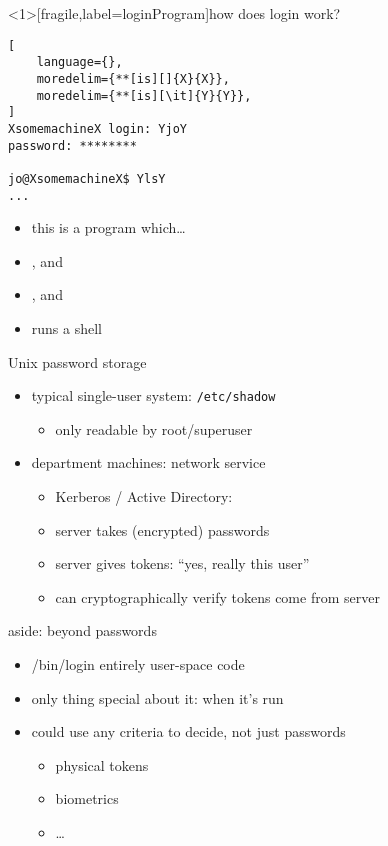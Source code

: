 \begin{frame}<1>[fragile,label=loginProgram]{how does login work?}
\begin{lstlisting}[
    language={},
    moredelim={**[is][]{X}{X}},
    moredelim={**[is][\it]{Y}{Y}},
]
XsomemachineX login: YjoY
password: ********

jo@XsomemachineX$ YlsY
...
\end{lstlisting}
\begin{itemize}
\item this is a program which\ldots
\item {}, and
\item {}, and
\item runs a shell
\end{itemize}
\end{frame}


\begin{frame}{Unix password storage}
    \begin{itemize}
    \item typical single-user system: \texttt{/etc/shadow}
    \begin{itemize}
    \item only readable by root/superuser
    \end{itemize}
    \item department machines: network service
    \begin{itemize}
        \item Kerberos / Active Directory:
        \item server takes (encrypted) passwords
        \item server gives tokens: ``yes, really this user''
        \item can cryptographically verify tokens come from server
    \end{itemize}
    \end{itemize}
\end{frame}

\begin{frame}{aside: beyond passwords}
    \begin{itemize}
    \item /bin/login entirely user-space code
    \item only thing special about it: when it's run
    \item could use any criteria to decide, not just passwords
        \begin{itemize}
        \item physical tokens
        \item biometrics
        \item \ldots
        \end{itemize}
    \end{itemize}
\end{frame}

